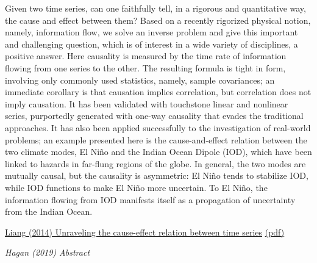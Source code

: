 \documentclass[
]{book}
\begin{document}
Given two time series, can one faithfully tell, in a rigorous and
quantitative way, the cause and effect between them?
Based on a recently rigorized physical notion, namely, information flow,
we solve an inverse problem and give this important and challenging question,
which is of interest in a wide variety of disciplines, a positive answer.
Here causality is measured by the time rate of information flowing
from one series to the other.
The resulting formula is tight in form, involving only commonly used statistics,
namely, sample covariances;
an immediate corollary is that causation implies correlation,
but correlation does not imply causation.
It has been validated with touchstone linear and nonlinear series,
purportedly generated with one-way causality that evades the traditional approaches.
It has also been applied successfully to the investigation of real-world problems;
an example presented here is the cause-and-effect relation between
the two climate modes, El Niño and the Indian Ocean Dipole (IOD),
which have been linked to hazards in far-flung regions of the globe.
In general, the two modes are mutually causal, but the causality is asymmetric:
El Niño tends to stabilize IOD, while IOD functions to make El Niño more uncertain.
To El Niño, the information flowing from IOD manifests itself as a propagation
of uncertainty from the Indian Ocean.

\href{https://journals.aps.org/pre/abstract/10.1103/PhysRevE.90.052150}{Liang (2014) Unraveling the cause-effect relation between time series}
\href{pdf/Liang_2014_Unraveling_Cause_Effect.pdf}{(pdf)}

\emph{Hagan (2019) Abstract}
\end{document}
